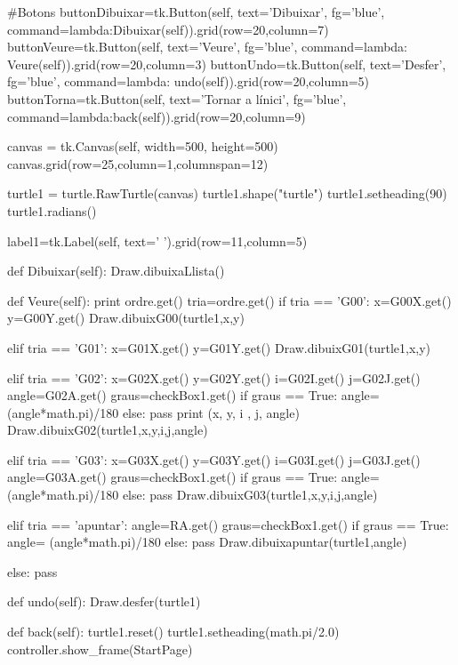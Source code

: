 \begin{python}
			#Botons
			buttonDibuixar=tk.Button(self, text='Dibuixar', fg='blue', command=lambda:Dibuixar(self)).grid(row=20,column=7)
			buttonVeure=tk.Button(self, text='Veure', fg='blue', command=lambda: Veure(self)).grid(row=20,column=3)
			buttonUndo=tk.Button(self, text='Desfer', fg='blue', command=lambda: undo(self)).grid(row=20,column=5)
			buttonTorna=tk.Button(self, text='Tornar a l\'inici', fg='blue', command=lambda:back(self)).grid(row=20,column=9)
			
			canvas = tk.Canvas(self, width=500, height=500)
			canvas.grid(row=25,column=1,columnspan=12)
			
			turtle1 = turtle.RawTurtle(canvas)
			turtle1.shape("turtle")
			turtle1.setheading(90)
			turtle1.radians()
			
			label1=tk.Label(self, text='          ').grid(row=11,column=5)
			
			
			
			
			def Dibuixar(self):
				Draw.dibuixaLlista()
			
			
			def Veure(self):
				print ordre.get()
				tria=ordre.get()
				if tria == 'G00':
					x=G00X.get()
					y=G00Y.get()
					Draw.dibuixG00(turtle1,x,y)
			
				elif tria == 'G01':
				x=G01X.get()
				y=G01Y.get()
				Draw.dibuixG01(turtle1,x,y)
				
				elif tria == 'G02':
					x=G02X.get()
					y=G02Y.get()
					i=G02I.get()
					j=G02J.get()
					angle=G02A.get()
					graus=checkBox1.get()
					if graus == True:
						angle= (angle*math.pi)/180
					else:
						pass
					print (x, y, i , j, angle)
					Draw.dibuixG02(turtle1,x,y,i,j,angle)
				
				elif tria == 'G03':
					x=G03X.get()
					y=G03Y.get()
					i=G03I.get()
					j=G03J.get()
					angle=G03A.get()
					graus=checkBox1.get()
					if graus == True:
						angle= (angle*math.pi)/180
					else:
						pass
					Draw.dibuixG03(turtle1,x,y,i,j,angle)
				
				elif tria == 'apuntar':
					angle=RA.get()
					graus=checkBox1.get()
					if graus == True:
						angle= (angle*math.pi)/180
					else:
						pass
					Draw.dibuixapuntar(turtle1,angle)
				
				else:
					pass
			
			def undo(self):
				Draw.desfer(turtle1)
			
			
			def back(self):
				turtle1.reset()
				turtle1.setheading(math.pi/2.0)
				controller.show_frame(StartPage)
\end{python}

